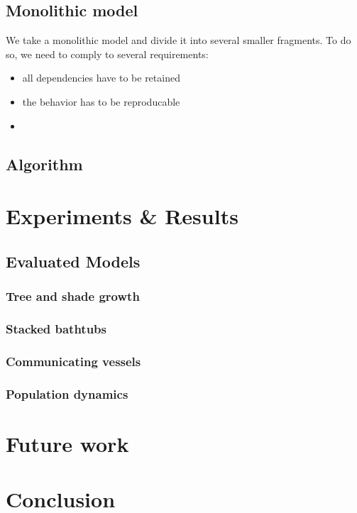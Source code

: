 \documentclass{article}
\begin{document}
\subsection{Monolithic model}
We take a monolithic model and divide it into several smaller fragments. To do so, we need to comply to several requirements:
\begin{itemize}
\item all dependencies have to be retained
\item the behavior has to be reproducable
\item 
\end{itemize}
\subsection{Algorithm}

\section{Experiments \& Results}
\subsection{Evaluated Models}
\subsubsection{Tree and shade growth}
\subsubsection{Stacked bathtubs}
\subsubsection{Communicating vessels}
\subsubsection{Population dynamics}

\section{Future work}

\section{Conclusion}
\end{document}
